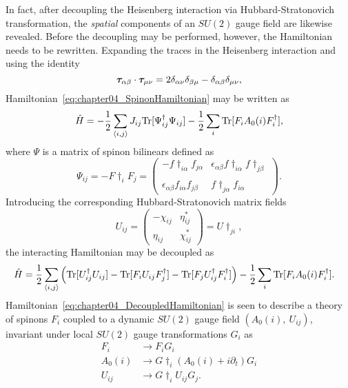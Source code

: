 In fact, after decoupling the Heisenberg interaction via Hubbard-Stratonovich transformation, the \textit{spatial} components of an $SU(2)$ gauge field are likewise revealed.
Before the decoupling may be performed, however, the Hamiltonian needs to be rewritten.
Expanding the traces in the Heisenberg interaction and using the identity
%
\begin{equation}
	\bm{\tau}_{\alpha\beta} \cdot \bm{\tau}_{\mu\nu} = 2\delta_{\alpha\nu} \delta_{\beta\mu} - \delta_{\alpha\beta} \delta_{\mu\nu},
\end{equation}
%
Hamiltonian~\eqref{eq:chapter04_SpinonHamiltonian} may be written as
%
\begin{equation}
	\hat{H} = -\frac{1}{2} \sum_{\langle i,j \rangle} J_{ij} \text{Tr}{[\Psi\ensuremath{^{\dagger}}_{ij} \Psi_{ij}]} - \frac{1}{2} \sum_i \text{Tr}{[F_i A_0(i) F\ensuremath{^{\dagger}}_i]},
\end{equation}
%
where $\Psi$ is a matrix of spinon bilinears defined as
%
\begin{equation}
	\Psi_{ij} = -F\dag_i F_j
			  =
			  \begin{pmatrix}
				-f\dag_{i\alpha} f_{j\alpha} &
				\epsilon_{\alpha\beta} f\dag_{i\alpha} f\dag_{j\beta} \\
				&\\
				\epsilon_{\alpha\beta} f_{i\alpha} f_{j\beta} &
				f\dag_{j\alpha} f_{i\alpha}
			  \end{pmatrix}.
\end{equation}
%
Introducing the corresponding Hubbard-Stratonovich matrix fields
%
\begin{equation}
	U_{ij} =
		   \begin{pmatrix}
			  -\chi_{ij} & \eta^*_{ij} \\
			  \eta_{ij}  & \chi^*_{ij}
		   \end{pmatrix}
		   = U\dag_{ji},
\end{equation}
%
the interacting Hamiltonian may be decoupled as
%
\begin{align}
	\hat{H}	&= \frac{1}{2} \sum_{\langle i,j \rangle} \left(\text{Tr}{[U\ensuremath{^{\dagger}}_{ij} U_{ij}]} - \text{Tr}{[F_i U_{ij} F\ensuremath{^{\dagger}}_j]} - \text{Tr}{[F_j U\ensuremath{^{\dagger}}_{ij} F\ensuremath{^{\dagger}}_i]}\right) - \frac{1}{2} \sum_i \text{Tr}{[F_i A_0(i) F\ensuremath{^{\dagger}}_i]}.
	\label{eq:chapter04_DecoupledHamiltonian}
\end{align}
%
Hamiltonian~\eqref{eq:chapter04_DecoupledHamiltonian} is seen to describe a theory of spinons $F_i$ coupled to a dynamic $SU(2)$ gauge field $(A_0(i),~U_{ij})$, invariant under local $SU(2)$ gauge transformations $G_i$ as
%
\begin{align}
	F_i &\rightarrow F_i G_i \nonumber\\
	A_0(i) &\rightarrow G\dag_i (A_0(i) + i\partial_t) G_i \nonumber\\
	U_{ij} &\rightarrow G\dag_i U_{ij} G_j.
\end{align}
%

